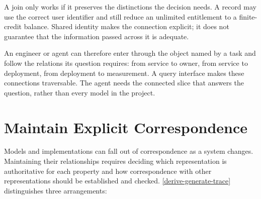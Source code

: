 
A join only works if it preserves the distinctions the decision needs. A record may use the correct user identifier and still reduce an unlimited entitlement to a finite-credit balance. Shared identity makes the connection explicit; it does not guarantee that the information passed across it is adequate.


An engineer or agent can therefore enter through the object named by a task and follow the relations its question requires: from service to owner, from service to deployment, from deployment to measurement. A query interface makes these connections traversable. The agent needs the connected slice that answers the question, rather than every model in the project.

\section{Maintain Explicit Correspondence}\label{heading:maintain-explicit-correspondence}




Models and implementations can fall out of correspondence as a system changes. Maintaining their relationships requires deciding which representation is authoritative for each property and how correspondence with other representations should be established and checked. \autoref{derive-generate-trace} distinguishes three arrangements:


